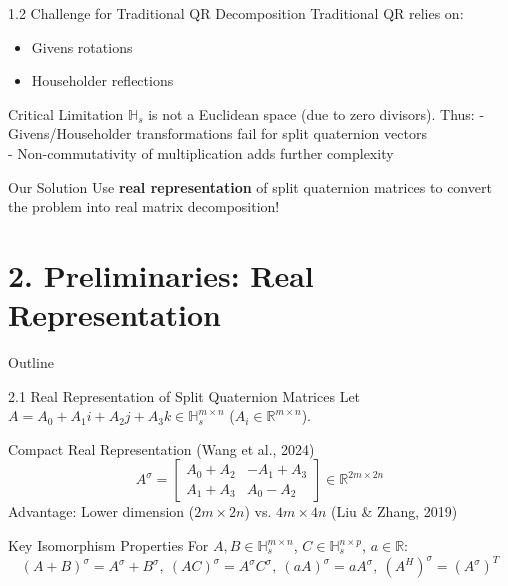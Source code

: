 \documentclass{beamer}
\begin{document}
\begin{frame}{1.2 Challenge for Traditional QR Decomposition}
  Traditional QR relies on:
  \begin{itemize}
    \item Givens rotations
    \item Householder reflections
  \end{itemize}
  
  \begin{alertblock}{Critical Limitation}
    $\mathbb{H}_s$ is not a Euclidean space (due to zero divisors). Thus:
    - Givens/Householder transformations fail for split quaternion vectors \\
    - Non-commutativity of multiplication adds further complexity
  \end{alertblock}
  
  \begin{block}{Our Solution}
    Use \textbf{real representation} of split quaternion matrices to convert the problem into real matrix decomposition!
  \end{block}
\end{frame}

\section{2. Preliminaries: Real Representation}
\begin{frame}{Outline}
  \tableofcontents[sectionstyle=show/shaded, subsectionstyle=show/show/shaded]
\end{frame}

\begin{frame}{2.1 Real Representation of Split Quaternion Matrices}
  Let $A = A_0 + A_1i + A_2j + A_3k \in \mathbb{H}_s^{m \times n}$ ($A_i \in \mathbb{R}^{m \times n}$).
  
  \begin{block}{Compact Real Representation (Wang et al., 2024)}
    \[
    A^\sigma = \begin{bmatrix}
    A_0 + A_2 & -A_1 + A_3 \\
    A_1 + A_3 & A_0 - A_2
    \end{bmatrix} \in \mathbb{R}^{2m \times 2n}
    \]
    Advantage: Lower dimension ($2m \times 2n$) vs. $4m \times 4n$ (Liu \& Zhang, 2019)
  \end{block}
  
  \begin{block}{Key Isomorphism Properties}
    For $A,B \in \mathbb{H}_s^{m \times n}$, $C \in \mathbb{H}_s^{n \times p}$, $a \in \mathbb{R}$:
    \[
    (A+B)^\sigma = A^\sigma+B^\sigma,\ (AC)^\sigma = A^\sigma C^\sigma,\ (aA)^\sigma = aA^\sigma,\ (A^H)^\sigma = (A^\sigma)^T
    \]
  \end{block}
\end{frame}
\end{document}
